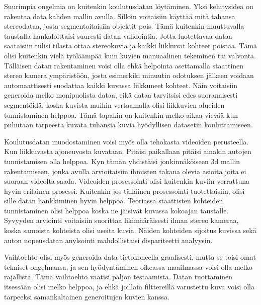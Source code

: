 Suurimpia ongelmia on kuitenkin koulutusdatan löytäminen.
Yksi kehitysidea on rakentaa data kahden mallin avulla.
Silloin voitaisiin käyttää mitä tahansa stereodataa, josta segmentoitaisiin objektit pois.
Tämä kuitenkin muuttuvalla taustalla hankaloittaisi suuresti datan validointia.
Jotta luotettavaa dataa saataisiin tulisi tilasta ottaa stereokuvia ja kaikki liikkuvat kohteet poistaa.
Tämä olisi kuitenkin vielä työläämpää kuin kuvien manuaalinen tekeminen tai valvonta.
Tälläisen datan rakentaminen voisi olla ehkä helpointa asettamalla staattinen stereo kamera ympäristöön,
josta esimerkiki minuutin odotuksen jälkeen voidaan automaattisesti suodattaa kaikki kuvassa liikkuneet kohteet.
Näin voitaisiin generoida melko monipuolista dataa, eikä dataa tarvitsisi edes suoranaisesti segmentöidä,
koska kuvista muihin vertaamalla olisi liikkuvien alueiden tunnistaminen helppoa.
Tämä tapakin on kuitenkin melko aikaa vievää kun puhutaan tarpeesta kuvata tuhansia kuvia hyödyllisen datasetin kouluttamiseen.

Koulutusdatan muodostaminen voisi myös olla tehokasta videoiden perusteella.
Kun liikkuvasta ajoneuvosta kuvataan. Pitäisi paikallaan pitäisi ainakin autojen tunnistamisen olla helppoa.
Kyn tämän yhdistäisi jonkinnäköiseen 3d mallin rakentamiseen, jonka avulla arvioitaisiin ihmisten takana olevia asioita joita ei suoraan videolta saada.
Videoiden prosessointi olisi kuitenkin kuviin verrattuna hyvin erilainen prosessi.
Kuitenkin jos tälläinen prosessointi tuotettaisiin, olisi sille datan hankkiminen hyvin helppoa.
Teoriassa staattisten kohteiden tunnistaminen olisi helppoa koska ne jäisivät kuvassa kokoajan taustalle.
Syvyyden arviointi voitaisiin suorittaa likimääräisesti ilman stereo kameraa, koska samoista kohteista olisi useita kuvia.
Näiden kohteiden sijoitus kuvissa sekä auton nopeusdatan anylsointi mahdollistaisi dispariteetti analyysin.

Vaihtoehto olisi myös generoida data tietokoneella graafisesti,
mutta se toisi omat tekniset ongelmansa, ja sen hyödyntäminen oikeassa maailmassa voisi olla melko rajallista.
Tämä vaihtoehto vaatisi paljon testaamista.
Datan tuottaminen itsessään olisi melko helppoa,
ja ehkä joillain filttereillä varustettu kuva voisi olla tarpeeksi samankaltainen generoitujen kuvien kanssa.
